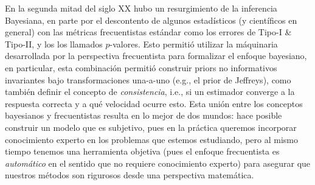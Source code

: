 En la segunda mitad del siglo XX hubo un resurgimiento de la inferencia Bayesiana, en parte por el descontento de algunos estadísticos (y científicos en general) con las métricas  frecuentistas estándar como los errores de Tipo-I \& Tipo-II, y los los llamados $p$-valores. Esto permitió utilizar la máquinaria desarrollada por la perspectiva frecuentista para formalizar el enfoque bayesiano, en particular, esta combinación permitió construir priors no informativos invariantes bajo transformaciones una-a-uno (e.g., el prior de Jeffreys), como también definir el concepto de \emph{consistencia}, i.e., si un estimador converge a la respuesta correcta y a qué velocidad ocurre esto. Esta unión entre los conceptos bayesianos y frecuentistas resulta en lo mejor de dos mundos: hace posible construir un modelo que es subjetivo, pues en la práctica queremos incorporar conocimiento experto en los problemas que estemos estudiando, pero al mismo tiempo tenemos una herramienta objetiva (pues el enfoque frecuentista es \emph{automático} en el sentido que no requiere conocimiento experto) para asegurar que nuestros métodos son rigurosos desde una perspectiva matemática. 

